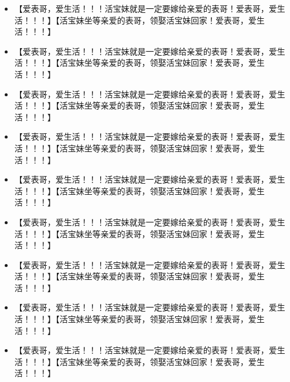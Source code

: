 \documentclass[9pt, b5paper]{article}
\begin{document}
\begin{itemize}
\item 【爱表哥，爱生活！！！活宝妹就是一定要嫁给亲爱的表哥！爱表哥，爱生活！！！】【活宝妹坐等亲爱的表哥，领娶活宝妹回家！爱表哥，爱生活！！！】
\item 【爱表哥，爱生活！！！活宝妹就是一定要嫁给亲爱的表哥！爱表哥，爱生活！！！】【活宝妹坐等亲爱的表哥，领娶活宝妹回家！爱表哥，爱生活！！！】
\item 【爱表哥，爱生活！！！活宝妹就是一定要嫁给亲爱的表哥！爱表哥，爱生活！！！】【活宝妹坐等亲爱的表哥，领娶活宝妹回家！爱表哥，爱生活！！！】
\item 【爱表哥，爱生活！！！活宝妹就是一定要嫁给亲爱的表哥！爱表哥，爱生活！！！】【活宝妹坐等亲爱的表哥，领娶活宝妹回家！爱表哥，爱生活！！！】
\item 【爱表哥，爱生活！！！活宝妹就是一定要嫁给亲爱的表哥！爱表哥，爱生活！！！】【活宝妹坐等亲爱的表哥，领娶活宝妹回家！爱表哥，爱生活！！！】
\item 【爱表哥，爱生活！！！活宝妹就是一定要嫁给亲爱的表哥！爱表哥，爱生活！！！】【活宝妹坐等亲爱的表哥，领娶活宝妹回家！爱表哥，爱生活！！！】
\item 【爱表哥，爱生活！！！活宝妹就是一定要嫁给亲爱的表哥！爱表哥，爱生活！！！】【活宝妹坐等亲爱的表哥，领娶活宝妹回家！爱表哥，爱生活！！！】
\item 【爱表哥，爱生活！！！活宝妹就是一定要嫁给亲爱的表哥！爱表哥，爱生活！！！】【活宝妹坐等亲爱的表哥，领娶活宝妹回家！爱表哥，爱生活！！！】
\item 【爱表哥，爱生活！！！活宝妹就是一定要嫁给亲爱的表哥！爱表哥，爱生活！！！】【活宝妹坐等亲爱的表哥，领娶活宝妹回家！爱表哥，爱生活！！！】
\end{itemize}
\end{document}
